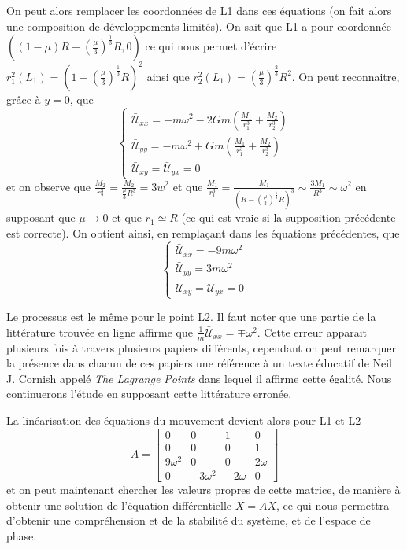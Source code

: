 \documentclass[12pt]{article}
\theoremstyle{definition}
\theoremstyle{definition}
\begin{document}
	On peut alors remplacer les coordonnées de L1 dans ces équations (on fait alors une composition de développements limités). On sait que L1 a pour coordonnée $((1-\mu)R-(\frac{\mu}{3})^\frac{1}{3}R, 0)$ ce qui nous permet d'écrire $r_1^2(L_1) = (1-(\frac{\mu}{3})^\frac{1}{3}R)^2$ ainsi que $r_2^2(L_1) = (\frac{\mu}{3})^\frac{2}{3}R^2$. On peut reconnaitre, grâce à $y=0$, que
	\begin{equation}
		 \begin{cases}
		 	\bar{\mathcal{U}}_{xx} = -m\omega^2 - 2Gm(\frac{M_1}{r_1^3} + \frac{M_2}{r_2^3})
		 	\\
		 	\bar{\mathcal{U}}_{yy} = -m\omega^2 + Gm(\frac{M_1}{r_1^3} + \frac{M_2}{r_2^3})
		 	\\
		 	\bar{\mathcal{U}}_{xy} = \bar{\mathcal{U}}_{yx} = 0
		 \end{cases}
	\end{equation}
	et on observe que $\frac{M_2}{r_2^3} = \frac{M_2}{\frac{\mu}{3}R^3} = 3w^2$ et que $\frac{M_1}{r_1^3} = \frac{M_1}{(R-(\frac{\mu}{3})^\frac{1}{3}R)^3} \sim \frac{3M_1}{R^3} \sim \omega^2$ en supposant que $\mu \to 0$ et que $r_1 \simeq R$ (ce qui est vraie si la supposition précédente est correcte). On obtient ainsi, en remplaçant dans les équations précédentes, que
	\begin{equation}
		\begin{cases}
		 	\bar{\mathcal{U}}_{xx} = -9m\omega^2
			\\
			\bar{\mathcal{U}}_{yy} = 3m\omega^2
			\\
			\bar{\mathcal{U}}_{xy} = \bar{\mathcal{U}}_{yx} = 0
		\end{cases}
	\end{equation}
	
	Le processus est le même pour le point L2. Il faut noter que une partie de la littérature trouvée en ligne affirme que $\frac{1}{m}\bar{\mathcal{U}}_{xx} = \mp \omega^2$. Cette erreur apparait plusieurs fois à travers plusieurs papiers différents, cependant on peut remarquer la présence dans chacun de ces papiers une référence à un texte éducatif de Neil J. Cornish appelé \textit{The Lagrange Points} dans lequel il affirme cette égalité. Nous continuerons l'étude en supposant cette littérature erronée.
	
	La linéarisation des équations du mouvement devient alors pour L1 et L2
	\begin{equation}
		A =
		\begin{bmatrix}
			0 & 0 & 1 & 0 \\
			0 & 0 & 0 & 1 \\
			9\omega^2 & 0
			& 0 & 2\omega \\
			0 & -3\omega^2
			& -2\omega & 0
		\end{bmatrix}
	\end{equation}
	et on peut maintenant chercher les valeurs propres de cette matrice, de manière à obtenir une solution de l'équation différentielle $\dot{X} = AX$, ce qui nous permettra d'obtenir une compréhension et de la stabilité du système, et de l'espace de phase.
	
\end{document}

